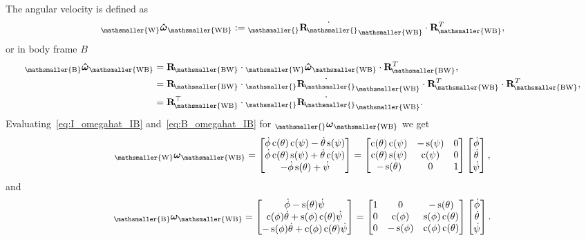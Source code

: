 \documentclass[10pt,a4paper,fleqn]{article}
\newcommand{\ssin}[0]{\operatorname{s}}
\newcommand{\scos}[0]{\operatorname{c}}
\newcommand{\bVec}[1]{\mathbf{#1}}
\newcommand{\vect}[3]{{_{\mathsmaller{\mathrm{#2}}}\mathbf{#1}_{\mathsmaller{\mathrm{#3}}}}} %
\newcommand{\vectdot}[3]{{_{\mathsmaller{\mathrm{#2}}}\dot{\mathbf{#1}}_{\mathsmaller{\mathrm{#3}}}}} %
\newcommand{\wfr}[0]{\ensuremath{W}} %
\newcommand{\bfr}[0]{\ensuremath{B}} %
\newcommand{\ori}[1]{\bVec{R}_{\!\mathsmaller{\mathrm{#1}}}} %
\newcommand{\bodyrate}[0]{\omega} %
\newcommand{\bodyrates}[0]{\boldsymbol{\bodyrate}} %
\begin{document}
%
The angular velocity is defined as
%
\begin{equation}
\vect{\hat{\bodyrates}}{\wfr}{\wfr \bfr} := \vectdot{\ori{}}{}{\wfr \bfr} \cdot \ori{\wfr \bfr}^{T} ,
\label{eq:I_omegahat_IB}
\end{equation}
%
or in body frame $\bfr$
%
\begin{align}
\vect{\hat{\bodyrates}}{\bfr}{\wfr \bfr} 
&= 
\ori{\bfr\wfr} \cdot \vect{\hat{\bodyrates}}{\wfr}{\wfr \bfr} \cdot \ori{\bfr \wfr}^{T}, \\
& = \ori{\bfr \wfr} \cdot \vectdot{\ori{}}{}{\wfr \bfr} \cdot \ori{\wfr \bfr}^{T}  \cdot \ori{\bfr \wfr}^{T}, \\
& = \ori{\wfr \bfr}^{\top} \cdot \vectdot{\ori{}}{}{\wfr \bfr}.
\label{eq:B_omegahat_IB}
\end{align}
%
Evaluating~\eqref{eq:I_omegahat_IB} and~\eqref{eq:B_omegahat_IB} for $\vect{\bodyrates}{}{\wfr \bfr}$ we get
%        
\begin{equation}
\vect{\bodyrates}{\wfr}{\wfr \bfr} =
\begin{bmatrix} \dot{\phi} \scos(\theta) \scos(\psi) - \dot{\theta} \ssin(\psi) \\
\dot{\phi} \scos(\theta) \ssin(\psi) + \dot{\theta} \scos(\psi) \\
-\dot{\phi} \ssin(\theta) + \dot{\psi} 
\end{bmatrix} 
= 
\begin{bmatrix} \scos(\theta) \scos(\psi) & -\ssin(\psi) & 0 \\
\scos(\theta) \ssin(\psi) & \scos(\psi) & 0 \\
-\ssin(\theta) & 0 & 1
\end{bmatrix} 
\begin{bmatrix}
	\dot{\phi}\\
	\dot{\theta}\\
	\dot{\psi}
\end{bmatrix} ,
\label{eq:I_omega_IB}
\end{equation}
%
and
%
\begin{equation}
\vect{\bodyrates}{\bfr}{\wfr \bfr} =
\begin{bmatrix}
	\dot{\phi} - \ssin(\theta) \dot{\psi} \\
	\scos(\phi) \dot{\theta} + \ssin(\phi)\scos(\theta) \dot{\psi}\\
	-\ssin(\phi) \dot{\theta} + \scos(\phi)\scos(\theta) \dot{\psi}
\end{bmatrix}
=
\begin{bmatrix}
	1 & 0 & -\ssin(\theta) \\
	0 & \scos(\phi) & \ssin(\phi)\scos(\theta) \\
	0 & -\ssin(\phi) & \scos(\phi)\scos(\theta)
\end{bmatrix}
\begin{bmatrix}
	\dot{\phi}\\
	\dot{\theta}\\
	\dot{\psi}
\end{bmatrix} .
\label{eq:B_omega_IB}
\end{equation}
\end{document}
